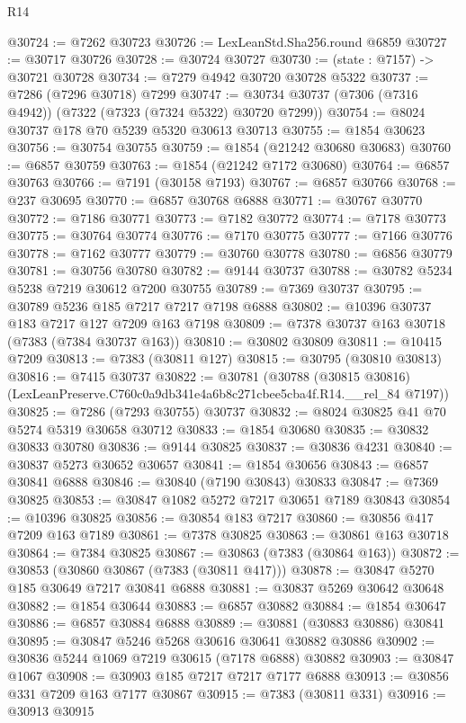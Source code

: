 \begin{lexlean}{R14}
\begin{coremodule}
@30724 := @7262 @30723
@30726 := LexLeanStd.Sha256.round @6859
@30727 := @30717 @30726
@30728 := @30724 @30727
@30730 := (state : @7157) -> @30721 @30728
@30734 := @7279 @4942 @30720 @30728 @5322
@30737 := @7286 (@7296 @30718) @7299
@30747 := @30734 @30737 (@7306 (@7316 @4942)) (@7322 (@7323 (@7324 @5322) @30720 @7299))
@30754 := @8024 @30737 @178 @70 @5239 @5320 @30613 @30713
@30755 := @1854 @30623
@30756 := @30754 @30755
@30759 := @1854 (@21242 @30680 @30683)
@30760 := @6857 @30759
@30763 := @1854 (@21242 @7172 @30680)
@30764 := @6857 @30763
@30766 := @7191 (@30158 @7193)
@30767 := @6857 @30766
@30768 := @237 @30695
@30770 := @6857 @30768 @6888
@30771 := @30767 @30770
@30772 := @7186 @30771
@30773 := @7182 @30772
@30774 := @7178 @30773
@30775 := @30764 @30774
@30776 := @7170 @30775
@30777 := @7166 @30776
@30778 := @7162 @30777
@30779 := @30760 @30778
@30780 := @6856 @30779
@30781 := @30756 @30780
@30782 := @9144 @30737
@30788 := @30782 @5234 @5238 @7219 @30612 @7200 @30755
@30789 := @7369 @30737
@30795 := @30789 @5236 @185 @7217 @7217 @7198 @6888
@30802 := @10396 @30737 @183 @7217 @127 @7209 @163 @7198
@30809 := @7378 @30737 @163 @30718 (@7383 (@7384 @30737 @163))
@30810 := @30802 @30809
@30811 := @10415 @7209
@30813 := @7383 (@30811 @127)
@30815 := @30795 (@30810 @30813)
@30816 := @7415 @30737
@30822 := @30781
    (@30788 (@30815 @30816) (LexLeanPreserve.C760c0a9db341e4a6b8c271cbee5cba4f.R14.__rel_84 @7197))
@30825 := @7286 (@7293 @30755) @30737
@30832 := @8024 @30825 @41 @70 @5274 @5319 @30658 @30712
@30833 := @1854 @30680
@30835 := @30832 @30833 @30780
@30836 := @9144 @30825
@30837 := @30836 @4231
@30840 := @30837 @5273 @30652 @30657
@30841 := @1854 @30656
@30843 := @6857 @30841 @6888
@30846 := @30840 (@7190 @30843) @30833
@30847 := @7369 @30825
@30853 := @30847 @1082 @5272 @7217 @30651 @7189 @30843
@30854 := @10396 @30825
@30856 := @30854 @183 @7217
@30860 := @30856 @417 @7209 @163 @7189
@30861 := @7378 @30825
@30863 := @30861 @163 @30718
@30864 := @7384 @30825
@30867 := @30863 (@7383 (@30864 @163))
@30872 := @30853 (@30860 @30867 (@7383 (@30811 @417)))
@30878 := @30847 @5270 @185 @30649 @7217 @30841 @6888
@30881 := @30837 @5269 @30642 @30648
@30882 := @1854 @30644
@30883 := @6857 @30882
@30884 := @1854 @30647
@30886 := @6857 @30884 @6888
@30889 := @30881 (@30883 @30886) @30841
@30895 := @30847 @5246 @5268 @30616 @30641 @30882 @30886
@30902 := @30836 @5244 @1069 @7219 @30615 (@7178 @6888) @30882
@30903 := @30847 @1067
@30908 := @30903 @185 @7217 @7217 @7177 @6888
@30913 := @30856 @331 @7209 @163 @7177 @30867
@30915 := @7383 (@30811 @331)
@30916 := @30913 @30915

\end{coremodule}
\end{lexlean}
